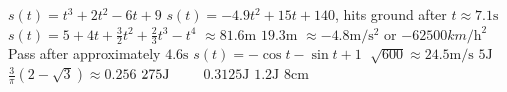 \begin{Answer}[ref={exApp}]
\Question%
$s (t) =t^{3} +2 t^{2} -6 t +9$ 
\Question%
$s (t) = -4.9 t^{2} +15 t +140$, hits ground after $t \approx 7.1 \mbox{s}$
\Question%
$s (t) =5 +4 t +\frac{3}{2} t^{2} +\frac{2}{3} t^{3} -t^{4}$
\Question%
$ \approx 81.6 \mbox{m}$ 
\Question%
$19.3 \mbox{m}$ 
\Question%
$ \approx  -4.8 \mathrm{m}/\mathrm{s}^{2}$ or $ -62500 km/\mathrm{h}^{2}$
\Question%
Pass after approximately $4.6 \mbox{s}$ 
\Question%
$s (t) = -\cos  t -\sin  t +1$ 
\Question%
$\;\sqrt{600} \approx 24.5 \mathrm{m}/\mbox{s}$
\Question%
$5 \mbox{J}$ 
\Question%
$\frac{3}{\pi } \left (2 -\sqrt{3}\right ) \approx 0.256$
\Question %
$275 \mbox{J}\text{\quad \quad }$
\Question %
$0.3125 \mbox{J}$ 
\Question%
$1.2 \mbox{J}$
\Question%
$8 \mbox{cm}$

\end{Answer}%
